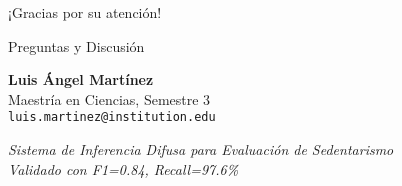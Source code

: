 \documentclass[aspectratio=169]{beamer}
\begin{document}
\begin{frame}[plain]
\begin{center}
\Huge
¡Gracias por su atención!

\vspace{1cm}

\Large
Preguntas y Discusión

\vspace{1cm}

\normalsize
\textbf{Luis Ángel Martínez}\\
Maestría en Ciencias, Semestre 3\\
\texttt{luis.martinez@institution.edu}

\vspace{0.5cm}

\textit{Sistema de Inferencia Difusa para Evaluación de Sedentarismo}\\
\textit{Validado con F1=0.84, Recall=97.6\%}
\end{center}
\end{frame}
\end{document}
